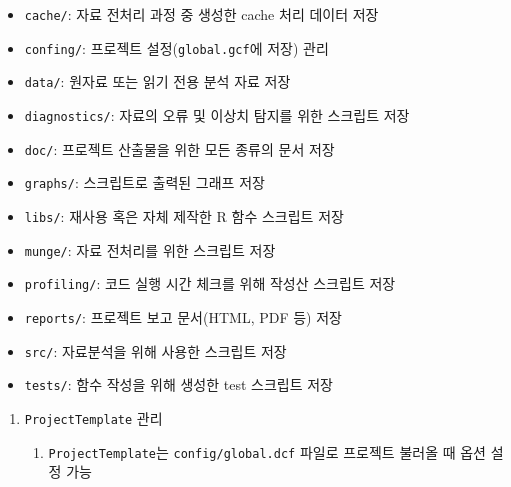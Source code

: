 \documentclass[11pt,a4paper]{book}
\providecommand{\tightlist}{%
  \setlength{\itemsep}{0pt}\setlength{\parskip}{0pt}}
\theoremstyle{definition}
\theoremstyle{definition}
\theoremstyle{definition}
\theoremstyle{remark}
\begin{document}
\begin{enumerate}
  \begin{itemize}
  \tightlist
  \item
    \texttt{cache/}: 자료 전처리 과정 중 생성한 cache 처리 데이터 저장
  \item
    \texttt{confing/}: 프로젝트 설정(\texttt{global.gcf}에 저장) 관리
  \item
    \texttt{data/}: 원자료 또는 읽기 전용 분석 자료 저장
  \item
    \texttt{diagnostics/}: 자료의 오류 및 이상치 탐지를 위한 스크립트
    저장
  \item
    \texttt{doc/}: 프로젝트 산출물을 위한 모든 종류의 문서 저장
  \item
    \texttt{graphs/}: 스크립트로 출력된 그래프 저장
  \item
    \texttt{libs/}: 재사용 혹은 자체 제작한 R 함수 스크립트 저장
  \item
    \texttt{munge/}: 자료 전처리를 위한 스크립트 저장
  \item
    \texttt{profiling/}: 코드 실행 시간 체크를 위해 작성산 스크립트 저장
  \item
    \texttt{reports/}: 프로젝트 보고 문서(HTML, PDF 등) 저장
  \item
    \texttt{src/}: 자료분석을 위해 사용한 스크립트 저장
  \item
    \texttt{tests/}: 함수 작성을 위해 생성한 test 스크립트 저장
  \end{itemize}
\end{enumerate}

\begin{enumerate}
\def\labelenumi{\arabic{enumi}.}
\setcounter{enumi}{2}
\tightlist
\item
  \texttt{ProjectTemplate} 관리

  \begin{enumerate}
  \def\labelenumii{\arabic{enumii})}
  \tightlist
  \item
    \texttt{ProjectTemplate}는 \texttt{config/global.dcf} 파일로
    프로젝트 불러올 때 옵션 설정 가능
  \end{enumerate}
\end{enumerate}

\footnotesize
\end{document}
